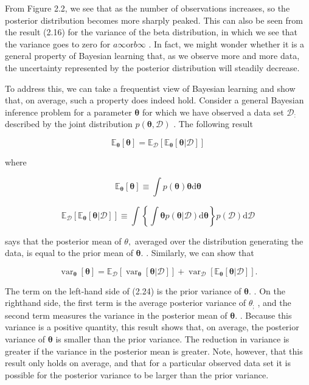 \documentclass[
  10
]{article}
\begin{document}
From Figure 2.2, we see that as the number of observations increases, so
the posterior distribution becomes more sharply peaked. This can also be
seen from the result (2.16) for the variance of the beta distribution,
in which we see that the variance goes to zero for
\(a  \infty \mathrm { o r } b  \infty\) . In fact, we might wonder
whether it is a general property of Bayesian learning that, as we
observe more and more data, the uncertainty represented by the posterior
distribution will steadily decrease.

To address this, we can take a frequentist view of Bayesian learning and
show that, on average, such a property does indeed hold. Consider a
general Bayesian inference problem for a parameter \(\pmb \theta\) for
which we have observed a data set \(\mathcal { D } _ { : }\) described
by the joint distribution \(p ( \pmb \theta , \mathcal { D } )\) . The
following result

\[
\mathbb {E} _ {\boldsymbol {\theta}} [ \boldsymbol {\theta} ] = \mathbb {E} _ {\mathcal {D}} \left[ \mathbb {E} _ {\boldsymbol {\theta}} [ \boldsymbol {\theta} | \mathcal {D} ] \right]\tag{2.21}
\]

where

\[
\mathbb {E} _ {\boldsymbol {\theta}} [ \boldsymbol {\theta} ] \equiv \int p (\boldsymbol {\theta}) \boldsymbol {\theta} \mathrm{d} \boldsymbol {\theta}\tag{2.22}
\]

\[
\mathbb {E} _ {\mathcal {D}} [ \mathbb {E} _ {\boldsymbol {\theta}} [ \boldsymbol {\theta} | \mathcal {D} ] ] \equiv \int \left\{\int \boldsymbol {\theta} p (\boldsymbol {\theta} | \mathcal {D}) \mathrm{d} \boldsymbol {\theta} \right\} p (\mathcal {D}) \mathrm{d} \mathcal {D}\tag{2.23}
\]

says that the posterior mean of \(\theta ,\) averaged over the
distribution generating the data, is equal to the prior mean of
\(\pmb { \theta } .\) . Similarly, we can show that

\[
\operatorname{var} _ {\boldsymbol {\theta}} [ \boldsymbol {\theta} ] = \mathbb {E} _ {\mathcal {D}} \left[ \operatorname{var} _ {\boldsymbol {\theta}} [ \boldsymbol {\theta} | \mathcal {D} ] \right] + \operatorname{var} _ {\mathcal {D}} \left[ \mathbb {E} _ {\boldsymbol {\theta}} [ \boldsymbol {\theta} | \mathcal {D} ] \right].\tag{2.24}
\]

The term on the left-hand side of (2.24) is the prior variance of
\(\pmb { \theta } .\) . On the righthand side, the first term is the
average posterior variance of \(\theta _ { ; }\) , and the second term
measures the variance in the posterior mean of \(\pmb \theta .\) .
Because this variance is a positive quantity, this result shows that, on
average, the posterior variance of \(\pmb \theta\) is smaller than the
prior variance. The reduction in variance is greater if the variance in
the posterior mean is greater. Note, however, that this result only
holds on average, and that for a particular observed data set it is
possible for the posterior variance to be larger than the prior
variance.
\end{document}

